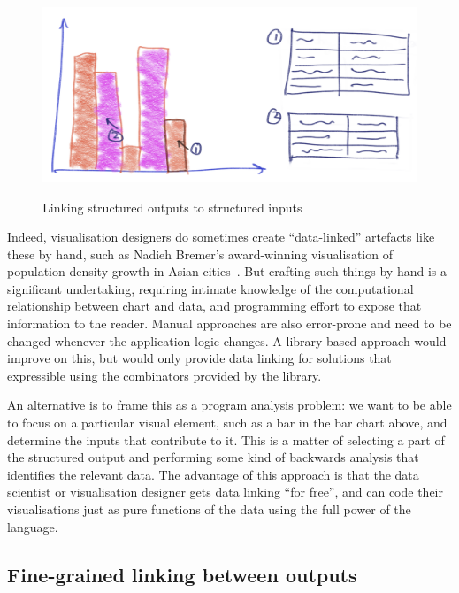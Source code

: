 \begin{figure}[H]
   {\includegraphics[scale=0.05]{fig/example/data-linking.png}}
   \caption{Linking structured outputs to structured inputs}
   \label{fig:introduction:data-linking}
\end{figure}

Indeed, visualisation designers do sometimes create ``data-linked'' artefacts like these by hand, such as Nadieh Bremer's award-winning visualisation of population density growth in Asian cities~\cite{bremer15}. But crafting such things by hand is a significant undertaking, requiring intimate knowledge of the computational relationship between chart and data, and programming effort to expose that information to the reader. Manual approaches are also error-prone and need to be changed whenever the application logic changes. A library-based approach would improve on this, but would only provide data linking for solutions that expressible using the combinators provided by the library.

An alternative is to frame this as a program analysis problem: we want to be able to focus on a particular visual element, such as a bar in the bar chart above, and determine the inputs that contribute to it. This is a matter of selecting a part of the structured output and performing some kind of backwards analysis that identifies the relevant data. The advantage of this approach is that the data scientist or visualisation designer gets data linking ``for free'', and can code their visualisations just as pure functions of the data using the full power of the language.

\subsection{Fine-grained linking between outputs}

